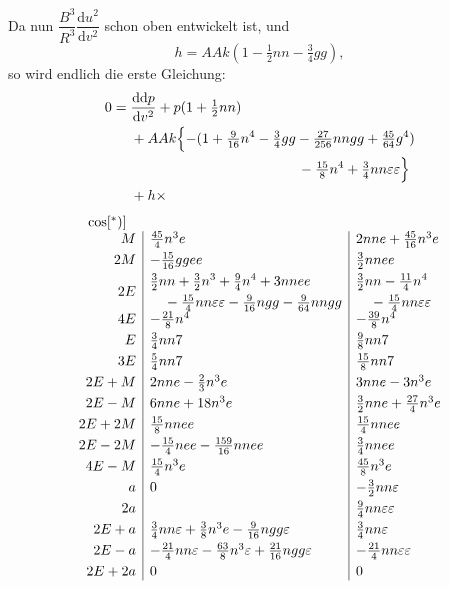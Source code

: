 \clearpage
\begingroup
\fancyhead{}
\renewcommand{\headrulewidth}{0pt}
\thispagestyle{VIIPrinted637}
\par\noindent Da nun \(\dfrac{B^3}{R^3}\dfrac{\mathrm du^2}{\mathrm dv^2}\) schon oben entwickelt ist, und
\[
h=AAk(1-\tfrac12nn-\tfrac34gg),
\]
\noindent so wird endlich die erste Gleichung:
\[
\begin{aligned}
0={}&\frac{\mathrm d\mathrm dp}{\mathrm dv^2}+p(1+\tfrac12nn)\\
&+AAk\Bigl\{-(1+\tfrac{9}{16}n^4-\tfrac34gg-\tfrac{27}{256}nngg+\tfrac{45}{64}g^4)\\
&\hspace{42mm}-\tfrac{15}{8}n^4+\tfrac34nn\varepsilon\varepsilon\Bigr\}\\
&+h\times
\end{aligned}
\]
\[
\begin{array}{r|l|l}
\multicolumn{1}{c}{\cos[{}^{*})]}&\multicolumn{1}{c}{}&\\
M&\tfrac{45}{4}n^3e&2nne+\tfrac{45}{16}n^3e\\[3pt]
2M&-\tfrac{15}{16}ggee&\tfrac32nnee\\[3pt]
2E&\begin{aligned}
&\tfrac32nn+\tfrac32n^3+\tfrac94n^4+3nnee\\
&\quad-\tfrac{15}{4}nn\varepsilon\varepsilon-\tfrac{9}{16}ngg-\tfrac{9}{64}nngg
\end{aligned}&
\begin{aligned}
&\tfrac32nn-\tfrac{11}{4}n^4\\
&\quad-\tfrac{15}{4}nn\varepsilon\varepsilon
\end{aligned}\\[3pt]
4E&-\tfrac{21}{8}n^4&-\tfrac{39}{8}n^4\\[3pt]
E&\tfrac34nn7&\tfrac98nn7\\[3pt]
3E&\tfrac54nn7&\tfrac{15}{8}nn7\\[3pt]
2E+M&2nne-\tfrac23n^3e&3nne-3n^3e\\[3pt]
2E-M&6nne+18n^3e&\tfrac32nne+\tfrac{27}{4}n^3e\\[3pt]
2E+2M&\tfrac{15}{8}nnee&\tfrac{15}{4}nnee\\[3pt]
2E-2M&-\tfrac{15}{4}nee-\tfrac{159}{16}nnee&\tfrac34nnee\\[3pt]
4E-M&\tfrac{15}{4}n^3e&\tfrac{45}{8}n^3e\\[3pt]
a&0&-\tfrac32nn\varepsilon\\[3pt]
2a&&\tfrac94nn\varepsilon\varepsilon\\[3pt]
2E+a&\tfrac34nn\varepsilon+\tfrac38n^3e-\tfrac{9}{16}ngg\varepsilon&\tfrac34nn\varepsilon\\[3pt]
2E-a&-\tfrac{21}{4}nn\varepsilon-\tfrac{63}{8}n^3\varepsilon+\tfrac{21}{16}ngg\varepsilon&-\tfrac{21}{4}nn\varepsilon\varepsilon\\[3pt]
2E+2a&0&0
\end{array}
\]
